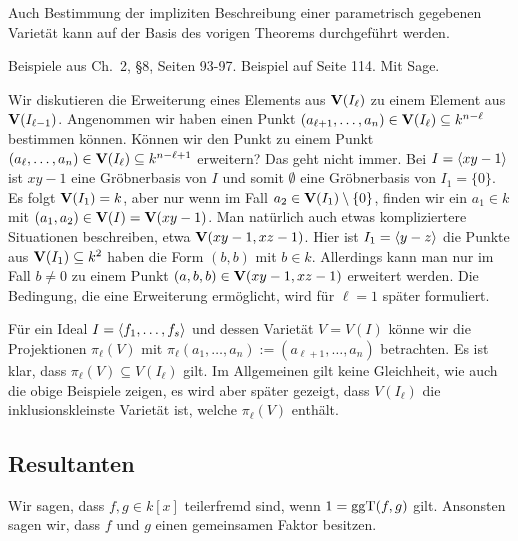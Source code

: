 \documentclass[11pt]{article}
\numberwithin{equation}{section}
\begin{document}
\begin{remark}
	Auch Bestimmung der impliziten Beschreibung einer parametrisch gegebenen Varietät kann auf der Basis des vorigen Theorems durchgeführt werden. 
\end{remark} 

\begin{beispiel}
	Beispiele aus Ch.~2, \S8, Seiten 93-97. Beispiel auf Seite 114. Mit Sage. 
\end{beispiel} 

\begin{remark} 
Wir diskutieren die Erweiterung eines Elements aus $\mathbf{V}(I_\ell)$ zu einem Element aus $\mathbf{V}(I_{\ell -1})$. Angenommen wir haben einen Punkt $(a_{\ell+1},\ldots,a_n) \in \mathbf{V}(I_\ell) \subseteq k^{n-\ell}$ bestimmen können. Können wir den Punkt zu einem Punkt $(a_\ell,\ldots, a_n) \in \mathbf{V}(I_\ell) \subseteq k^{n-\ell +1}$ erweitern? Das geht nicht immer. Bei $I=\left<  x y - 1 \right>$ ist $xy -1$ eine Gröbnerbasis von $I$ und somit $\emptyset$ eine Gröbnerbasis von $I_1 = \{0\}$.  Es folgt $\mathbf{V}(I_1) = k$, aber nur wenn im Fall $a_2 \in \mathbf{V}(I_1) \setminus \{0\}$, finden wir ein $a_1 \in k$ mit $(a_1,a_2) \in \mathbf{V}(I) = \mathbf{V}( xy -1)$. Man natürlich auch etwas kompliziertere Situationen beschreiben, etwa $\mathbf{V}(x y - 1, x z - 1)$. Hier ist $I_1 = \left< y-z \right>$ die Punkte aus $\mathbf{V}(I_1) \subseteq k^2$ haben die Form $(b,b)$ mit $b \in k$. Allerdings kann man nur im Fall $b \ne 0$ zu einem Punkt $(a,b,b) \in \mathbf{V}(xy -1, xz -1)$ erweitert werden. Die Bedingung, die eine Erweiterung ermöglicht, wird für $\ell=1$ später formuliert. 
\end{remark} 

\begin{remark}
	Für ein Ideal $I = \left< f_1,\ldots,f_s \right>$ und dessen Varietät $V = V(I)$ könne wir die Projektionen $\pi_\ell(V)$ mit $\pi_\ell(a_1,\ldots,a_n) := (a_{\ell+1},\ldots,a_n)$ betrachten. Es ist klar, dass $\pi_\ell(V) \subseteq V(I_\ell)$ gilt. Im Allgemeinen gilt keine Gleichheit, wie auch die obige Beispiele zeigen, es wird aber später gezeigt, dass $V(I_\ell)$ die inklusionskleinste Varietät ist, welche $\pi_\ell(V)$ enthält. 
\end{remark} 





\subsection{Resultanten} 

\begin{definition} 
	Wir sagen, dass $f,g \in k[x]$ teilerfremd sind, wenn $1 = \operatorname{ggT}(f,g)$ gilt. Ansonsten sagen wir, dass $f$ und $g$ einen gemeinsamen Faktor besitzen. 
\end{definition} 
\end{document}
